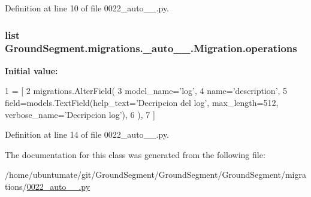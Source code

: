 Definition at line 10 of file 0022\+\_\+auto\+\_\+\_.\+py.

\hypertarget{class_ground_segment_1_1migrations_1_10022__auto__20161202__1258_1_1_migration_ac5029b01431d0d17a0030c3db4018a16}{}
\subsubsection[{operations}]{\setlength{\rightskip}{0pt plus 5cm}list Ground\+Segment.\+migrations.\+\_\+auto\+\_\+\_.\+Migration.\+operations\hspace{0.3cm}{\ttfamily [static]}}\label{class_ground_segment_1_1migrations_1_10022__auto__20161202__1258_1_1_migration_ac5029b01431d0d17a0030c3db4018a16}
{\bfseries Initial value\+:}
\begin{DoxyCode}
1 = [
2         migrations.AlterField(
3             model\_name=\textcolor{stringliteral}{'log'},
4             name=\textcolor{stringliteral}{'description'},
5             field=models.TextField(help\_text=\textcolor{stringliteral}{'Decripcion del log'}, max\_length=512, verbose\_name=\textcolor{stringliteral}{'Decripcion
       log'}),
6         ),
7     ]
\end{DoxyCode}


Definition at line 14 of file 0022\+\_\+auto\+\_\+\_.\+py.



The documentation for this class was generated from the following file\+:\begin{DoxyCompactItemize}
\item 
/home/ubuntumate/git/\+Ground\+Segment/\+Ground\+Segment/\+Ground\+Segment/migrations/\hyperlink{0022__auto__20161202__1258_8py}{0022\+\_\+auto\+\_\+\_.\+py}\end{DoxyCompactItemize}

